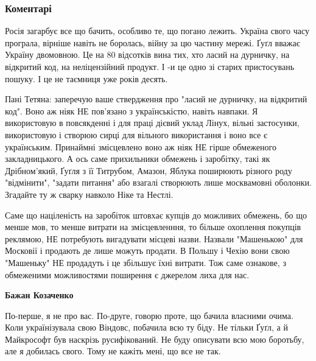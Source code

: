  
 
 
 
 
\subsubsection{Коментарі}

\begin{itemize} %

Росія загарбує все що бачить, особливо те, що погано лежить. Україна свого часу
програла, вірніше навіть не боролась, війну за цю частину мережі. Ґуґл вважає
Україну двомовною. Це на 80 відсотків вина тих, хто ласий на дурничку, на
відкритий код, на неліцензійний продукт. І -и це одно зі старих пристосувань
пошуку. І це не таємниця уже років десять.

\begin{itemize} %

Пані Тетяна: заперечую ваше ствердження про "ласий не дурничку, на відкритий
код". Воно аж ніяк НЕ пов'язано з українськістю, навіть навпаки. Я використовую
в повсякденні і для праці дієвий уклад Лінух, вільні застосунки, використовую і
створюю сирці для вільного використання і воно все є українським. Принаймні
змісцевлено воно аж ніяк НЕ гірше обмеженого закладницького. А ось саме
прихильники обмежень і заробітку, такі як Дрібном'який, Ґуґля з її Титрубом,
Амазон, Яблука поширюють різного роду "відмінити", "задати питання" або взагалі
створюють лише москвамовні оболонки. Згадайте ту ж сварку навколо Ніке та
Нестлі.

Саме що націленість на заробіток штовхає купців до можливих обмежень, бо що
менше мов, то менше витрати на змісцевленння, то більше охоплення покупців
реклямою, НЕ потребують вигадувати місцеві назви. Назвали "Машенькою" для
Московії і продають де лише можуть продати. В Польшу і Чехію вони свою
"Машеньку" НЕ продадуть і це збільшує їхні витрати. Тож саме ознакове, з
обмеженими можливостями поширення є джерелом лиха для нас.

\begin{itemize} %
\textbf{Бажан Козаченко} 

По-перше, я не про вас. По-друге, говорю проте, що бачила власними очима. Коли
українізувала свою Віндовс, побачила всю ту біду. Не тільки Ґуґл, а й
Майкрософт був наскрізь русифікований. Не буду описувати всю мою боротьбу, але
я добилась свого. Тому не кажіть мені, що все не так.


\end{itemize}
\end{itemize}
\end{itemize}
